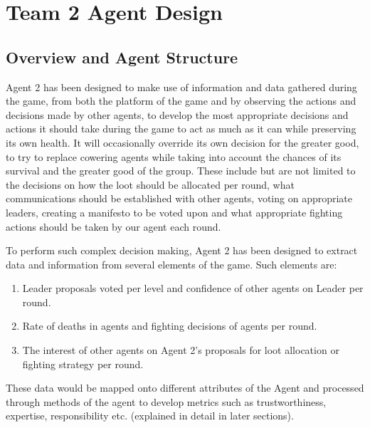 \chapter{Team 2 Agent Design}

\section{Overview and Agent Structure}
Agent 2 has been designed to make use of information and data gathered during the game, from both the platform of the game and by observing the actions and decisions made by other agents, to develop the most appropriate decisions and actions it should take during the game to act as much as it can while preserving its own health. It will occasionally override its own decision for the greater good, to try to replace cowering agents while taking into account the chances of its survival and the greater good of the group. These include but are not limited to the decisions on how the loot should be allocated per round, what communications should be established with other agents, voting on appropriate leaders, creating a manifesto to be voted upon and what appropriate fighting actions should be taken by our agent each round.

To perform such complex decision making, Agent 2 has been designed to extract data and information from several elements of the game. Such elements are:

\begin{enumerate}
    \item Leader proposals voted per level and confidence of other agents on Leader per round.
    \item Rate of deaths in agents and fighting decisions of agents per round.
    \item The interest of other agents on Agent 2's proposals for loot allocation or fighting strategy per round. 
\end{enumerate}

These data would be mapped onto different attributes of the Agent and processed through methods of the agent to develop metrics such as trustworthiness, expertise, responsibility etc. (explained in detail in later sections).

